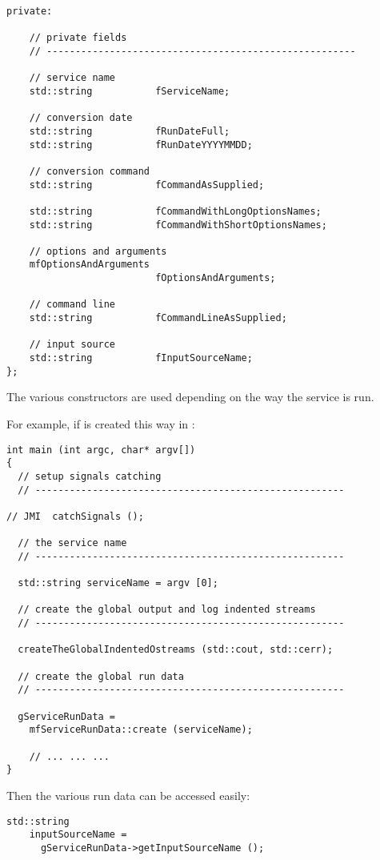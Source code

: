 \begin{lstlisting}[language=CPlusPlus]
  private:

    // private fields
    // ------------------------------------------------------

    // service name
    std::string           fServiceName;

    // conversion date
    std::string           fRunDateFull;
    std::string           fRunDateYYYYMMDD;

    // conversion command
    std::string           fCommandAsSupplied;

    std::string           fCommandWithLongOptionsNames;
    std::string           fCommandWithShortOptionsNames;

    // options and arguments
    mfOptionsAndArguments
                          fOptionsAndArguments;

    // command line
    std::string           fCommandLineAsSupplied;

    // input source
    std::string           fInputSourceName;
};
\end{lstlisting}

The various constructors are used depending on the way the service is run.

For example, if is created this way in :
\begin{lstlisting}[language=CPlusPlus]
int main (int argc, char* argv[])
{
  // setup signals catching
  // ------------------------------------------------------

// JMI	catchSignals ();

  // the service name
  // ------------------------------------------------------

  std::string serviceName = argv [0];

  // create the global output and log indented streams
  // ------------------------------------------------------

  createTheGlobalIndentedOstreams (std::cout, std::cerr);

  // create the global run data
  // ------------------------------------------------------

  gServiceRunData =
    mfServiceRunData::create (serviceName);

	// ... ... ...
}
\end{lstlisting}

Then the various run data can be accessed easily:
\begin{lstlisting}[language=CPlusPlus]
  std::string
    inputSourceName =
      gServiceRunData->getInputSourceName ();
\end{lstlisting}

